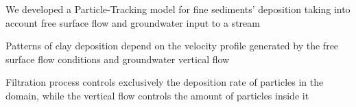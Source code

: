 \documentclass[draft,linenumbers]{agujournal2018}
\begin{document}






\begin{keypoints}
\item We developed a Particle-Tracking model for fine sediments' deposition taking into account free surface flow and groundwater input to a stream
\item Patterns of clay deposition depend on the velocity profile generated by the free surface flow conditions and groundwater vertical flow
\item Filtration process controls exclusively the deposition rate of particles in the domain, while the vertical flow controls the amount of particles inside it
\end{keypoints}

\end{document}
